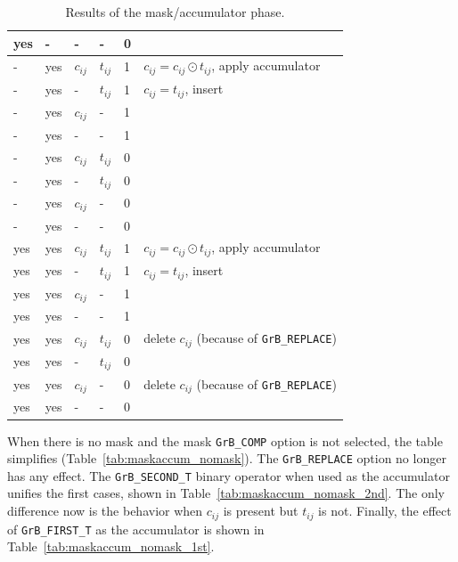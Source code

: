\begin{table}
{\begin{tabular}{lllll|l}
    yes&-   &  -       &  -        & 0    &   \\
\hline
    -  &yes & $c_{ij}$ & $t_{ij}$  & 1    &  $c_{ij} = c_{ij} \odot t_{ij}$, apply accumulator \\
    -  &yes &  -       & $t_{ij}$  & 1    &  $c_{ij} = t_{ij}$, insert \\
    -  &yes & $c_{ij}$ &  -        & 1    &   \\
    -  &yes &  -       &  -        & 1    &   \\
    -  &yes & $c_{ij}$ & $t_{ij}$  & 0    &   \\
    -  &yes &  -       & $t_{ij}$  & 0    &   \\
    -  &yes & $c_{ij}$ &  -        & 0    &   \\
    -  &yes &  -       &  -        & 0    &   \\
\hline
    yes&yes & $c_{ij}$ & $t_{ij}$  & 1    &  $c_{ij} = c_{ij} \odot t_{ij}$, apply accumulator \\
    yes&yes &  -       & $t_{ij}$  & 1    &  $c_{ij} = t_{ij}$, insert \\
    yes&yes & $c_{ij}$ &  -        & 1    &   \\
    yes&yes &  -       &  -        & 1    &   \\
    yes&yes & $c_{ij}$ & $t_{ij}$  & 0    &  delete $c_{ij}$  (because of \verb'GrB_REPLACE') \\
    yes&yes &  -       & $t_{ij}$  & 0    &   \\
    yes&yes & $c_{ij}$ &  -        & 0    &  delete $c_{ij}$  (because of \verb'GrB_REPLACE') \\
    yes&yes &  -       &  -        & 0    &   \\
\hline
\end{tabular}
}
\caption{Results of the mask/accumulator phase. \label{tab:maskaccum}}
\end{table}

When there is no mask and the mask \verb'GrB_COMP' option is not selected, the
table simplifies (Table~\ref{tab:maskaccum_nomask}).  The \verb'GrB_REPLACE'
option no longer has any effect.  The \verb'GrB_SECOND_T' binary operator when
used as the accumulator unifies the first cases, shown in
Table~\ref{tab:maskaccum_nomask_2nd}.  The only difference now is the behavior
when $c_{ij}$ is present but $t_{ij}$ is not.  Finally, the effect of
\verb'GrB_FIRST_T' as the accumulator is shown in
Table~\ref{tab:maskaccum_nomask_1st}.

